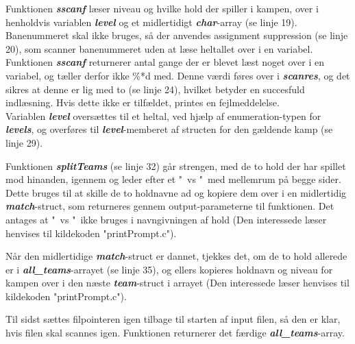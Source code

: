 Funktionen \textbf{\textit{sscanf}} læser niveau og hvilke hold der spiller i kampen, over i henholdvis variablen \textbf{\textit{level}} og et midlertidigt \textbf{\textit{char}}-array (se linje 19). Banenummeret skal ikke bruges, så der anvendes assignment suppression (se linje 20), som scanner banenummeret uden at læse heltallet over i en variabel. Funktionen \textbf{\textit{sscanf}} returnerer antal gange der er blevet læst noget over i en variabel, og tæller derfor ikke \%*d med. Denne værdi føres over i \textbf{\textit{scanres}}, og det sikres at denne er lig med to (se linje 24), hvilket betyder en succesfuld indlæsning. Hvis dette ikke er tilfældet, printes en fejlmeddelelse. 
\\
Variablen \textbf{\textit{level}} oversættes til et heltal, ved hjælp af enumeration-typen for \textbf{\textit{levels}}, og overføres til \textbf{\textit{level}}-memberet af structen for den gældende kamp (se linje 29).
\par
Funktionen \textbf{\textit{splitTeams}} (se linje 32) går strengen, med de to hold der har spillet mod hinanden, igennem og leder efter et "\ vs "\ med mellemrum på begge sider. Dette bruges til at skille de to holdnavne ad og kopiere dem over i en midlertidig \textbf{\textit{match}}-struct, som returneres gennem output-parameterne til funktionen. Det antages at "\ vs "\ ikke bruges i navngivningen af hold (Den interessede læser henvises til kildekoden "printPrompt.c").
\par
Når den midlertidige \textbf{\textit{match}}-struct er dannet, tjekkes det, om de to hold allerede er i \textbf{\textit{all\_teams}}-arrayet (se linje 35), og ellers kopieres holdnavn og niveau for kampen over i den næste \textbf{\textit{team}}-struct i arrayet (Den interessede læser henvises til kildekoden "printPrompt.c"). 
\par
Til sidst sættes filpointeren igen tilbage til starten af input filen, så den er klar, hvis filen skal scannes igen. Funktionen returnerer det færdige \textbf{\textit{all\_teams}}-array.

\clearpage

